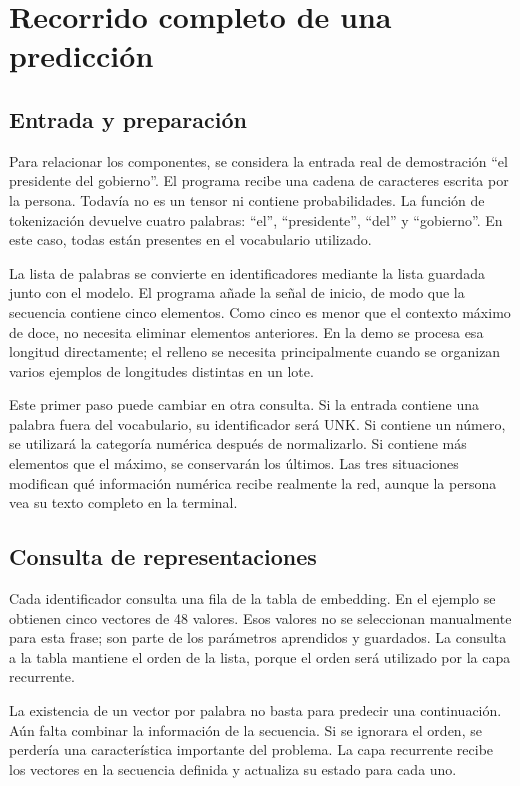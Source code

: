 \section{Recorrido completo de una predicción}
\subsection{Entrada y preparación}
Para relacionar los componentes, se considera la entrada real de demostración ``el presidente del gobierno''. El programa recibe una cadena de caracteres escrita por la persona. Todavía no es un tensor ni contiene probabilidades. La función de tokenización devuelve cuatro palabras: ``el'', ``presidente'', ``del'' y ``gobierno''. En este caso, todas están presentes en el vocabulario utilizado.

La lista de palabras se convierte en identificadores mediante la lista guardada junto con el modelo. El programa añade la señal de inicio, de modo que la secuencia contiene cinco elementos. Como cinco es menor que el contexto máximo de doce, no necesita eliminar elementos anteriores. En la demo se procesa esa longitud directamente; el relleno se necesita principalmente cuando se organizan varios ejemplos de longitudes distintas en un lote.

Este primer paso puede cambiar en otra consulta. Si la entrada contiene una palabra fuera del vocabulario, su identificador será UNK. Si contiene un número, se utilizará la categoría numérica después de normalizarlo. Si contiene más elementos que el máximo, se conservarán los últimos. Las tres situaciones modifican qué información numérica recibe realmente la red, aunque la persona vea su texto completo en la terminal.

\subsection{Consulta de representaciones}
Cada identificador consulta una fila de la tabla de embedding. En el ejemplo se obtienen cinco vectores de 48 valores. Esos valores no se seleccionan manualmente para esta frase; son parte de los parámetros aprendidos y guardados. La consulta a la tabla mantiene el orden de la lista, porque el orden será utilizado por la capa recurrente.

La existencia de un vector por palabra no basta para predecir una continuación. Aún falta combinar la información de la secuencia. Si se ignorara el orden, se perdería una característica importante del problema. La capa recurrente recibe los vectores en la secuencia definida y actualiza su estado para cada uno.

